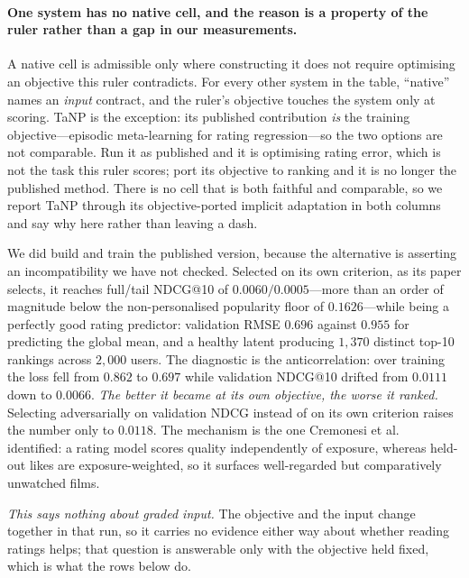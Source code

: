 \documentclass[11pt]{article}
\begin{document}
\paragraph{One system has no native cell, and the reason is a property of the ruler rather than a gap in our
measurements.}\label{sec:nativelimit} A native cell is admissible only where constructing it does not require
optimising an objective this ruler contradicts. For every other system in the table, ``native'' names an
\emph{input} contract, and the ruler's objective touches the system only at scoring. TaNP is the exception:
its published contribution \emph{is} the training objective---episodic meta-learning for rating
regression---so the two options are not comparable. Run it as published and it is optimising rating error,
which is not the task this ruler scores; port its objective to ranking and it is no longer the published
method. There is no cell that is both faithful and comparable, so we report TaNP through its
objective-ported implicit adaptation in both columns and say why here rather than leaving a dash.

We did build and train the published version, because the alternative is asserting an incompatibility we
have not checked. Selected on its own criterion, as its paper selects, it reaches full/tail NDCG@10 of
$0.0060/0.0005$---more than an order of magnitude below the
non-personalised popularity floor of $0.1626$---while being a perfectly good rating predictor: validation
RMSE $0.696$ against $0.955$ for predicting the global mean, and a healthy latent producing $1{,}370$
distinct top-10 rankings across $2{,}000$ users. The diagnostic is the anticorrelation: over training the
loss fell from $0.862$ to $0.697$ while validation NDCG@10 drifted from $0.0111$ down to $0.0066$. \emph{The
better it became at its own objective, the worse it ranked.} Selecting adversarially on validation NDCG
instead of on its own criterion raises the number only to $0.0118$. The mechanism is the one
Cremonesi et al.~\cite{cremonesi2010performance} identified: a rating model scores quality independently of
exposure, whereas held-out likes are exposure-weighted, so it surfaces well-regarded but comparatively
unwatched films.

\emph{This says nothing about graded input.} The objective and the input change together in that run, so it
carries no evidence either way about whether reading ratings helps; that question is answerable only with the
objective held fixed, which is what the rows below do.
\end{document}
